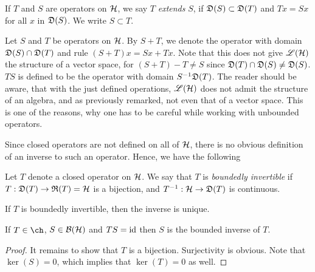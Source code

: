 \begin{defi}
  If $T$ and $S$ are operators on $\mathcal{H}$, we say $T$ \textit{extends} $S$,
  if $\mathfrak{D}(S)\subset
  \mathfrak{D}(T)$ and $ Tx = Sx$ for all $x$ in $ \mathfrak{D} (S)$. We write $S \subset T$.
\end{defi}

Let $S$ and $ T$ be operators on $\mathcal{H}$. By $S + T$,  we denote
the operator with domain 
$\mathfrak{D}(S) \cap \mathfrak{D}(T)$ and rule $(S + T)x = Sx + Tx$. Note that this does
not give $\mathscr{L}(\mathcal{H})$ the structure of a vector space, for 
$(S + T) - T \neq S$ since
$\mathfrak{D}(T)\cap \mathfrak{D}(S) \neq \mathfrak{D}(S)$.
$TS$ is defined to be the operator with domain $S^{-1} \mathfrak{D}(T)$. The reader should
be aware, that with the just defined operations, $\mathscr{L}(\mathcal{H})$ does not admit the
structure of an algebra, and as previously remarked, not even that of a
vector space. This is one
of the reasons, why one has to be careful while working with unbounded
operators. 

Since closed operators are not defined on all of $\mathcal{H}$,
there is no obvious definition of an inverse to such an operator.
Hence, we have the following

\begin{defi}
 Let $T$ denote a closed operator on $\mathcal{H}$. We say that $T$ is \textit{boundedly invertible} if
 $T:\mathfrak{D}(T) \to \mathfrak{R}(T)= \mathcal{H}$ is a bijection, and $T^{-1} :\mathcal{H} \to \mathfrak{D}(T)$
 is continuous.
\end{defi}

\begin{rem}
 If $T$ is boundedly invertible, then the inverse is unique.
\end{rem}

% 
% 
% 


\begin{lem}
 If $T \in \ch$, $S \in \mathcal{B}(\mathcal{H})$ and $ TS = \operatorname{id}$ then $S$ is the bounded inverse of $T$.
\end{lem}

\begin{proof}
 It remains to show that $T$ is a bijection.
 Surjectivity is obvious. Note that $\ker(S) =0$, which implies that 
 $\ker(T)=0$ as well.
 \end{proof}




% 
% 

 
















